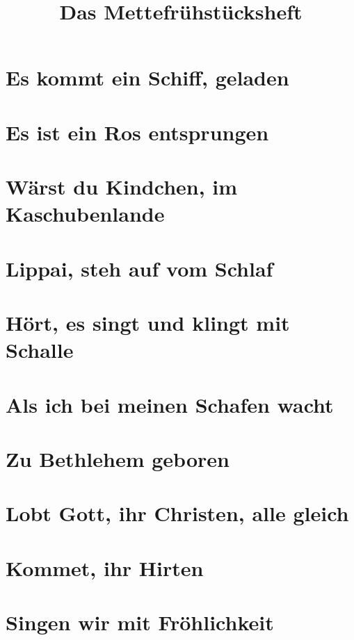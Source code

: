 \documentclass[10pt]{article}
\title{Das Mettefrühstücksheft}
\begin{document}
\maketitle
\newpage
\tableofcontents
\section{Es kommt ein Schiff, geladen}

\section{Es ist ein Ros entsprungen}

\section{Wärst du Kindchen, im Kaschubenlande}

\section{Lippai, steh auf vom Schlaf}

\section{Hört, es singt und klingt mit Schalle}

\section{Als ich bei meinen Schafen wacht}

\section{Zu Bethlehem geboren}

\section{Lobt Gott, ihr Christen, alle gleich}

\section{Kommet, ihr Hirten}

\section{Singen wir mit Fröhlichkeit}
\end{document}

